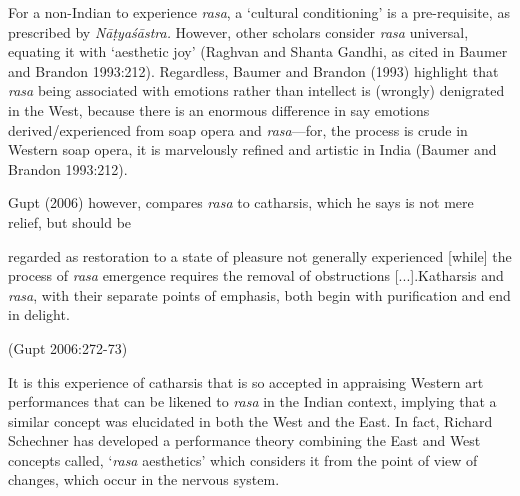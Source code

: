 
\vfill\eject

For a non-Indian to experience \textsl{rasa}, a ‘cultural conditioning’ is a pre-requisite, as prescribed by \textsl{Nāṭyaśāstra.} However, other scholars consider \textsl{rasa} universal, equating it with ‘aesthetic joy’ (Raghvan and Shanta Gandhi, as cited in Baumer and Brandon 1993:212).  Regardless, Baumer and Brandon (1993) highlight that \textsl{rasa} being associated with emotions rather than intellect is (wrongly) denigrated in the West, because there is an enormous difference in say emotions derived/experienced from soap opera and \textsl{rasa}---for, the process is crude in Western soap opera, it is marvelously refined and artistic in India (Baumer and Brandon 1993:212).

Gupt (2006) however, compares \textsl{rasa} to catharsis, which he says is not mere relief, but should be 

\begin{myquote}
regarded as restoration to a state of pleasure not generally experienced [while] the process of \textsl{rasa} emergence requires the removal of obstructions [...].Katharsis and \textsl{rasa}, with their separate points of emphasis, both begin with purification and end in delight. 

\hfill (Gupt 2006:272-73)
\end{myquote}

It is this experience of catharsis that is so accepted in appraising Western art performances that can be likened to \textsl{rasa} in the Indian context, implying that a similar concept was elucidated in both the West and the East. In fact, Richard Schechner has developed a performance theory combining the East and West concepts called, ‘\textsl{rasa} aesthetics’ which considers it from the point of view of changes, which occur in the nervous system. 

